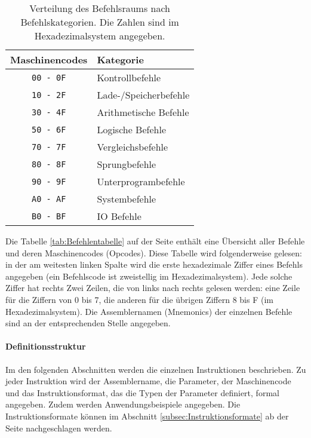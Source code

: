 \begin{table}
  \centering
  \begin{tabular}{|c|l|}                        \hline
    Maschinencodes   & Kategorie              \\\hline\hline
    \texttt{00 - 0F} & Kontrollbefehle        \\
    \texttt{10 - 2F} & Lade-/Speicherbefehle  \\
    \texttt{30 - 4F} & Arithmetische Befehle  \\
    \texttt{50 - 6F} & Logische Befehle       \\
    \texttt{70 - 7F} & Vergleichsbefehle      \\
    \texttt{80 - 8F} & Sprungbefehle          \\
    \texttt{90 - 9F} & Unterprogrambefehle    \\
    \texttt{A0 - AF} & Systembefehle          \\
    \texttt{B0 - BF} & IO Befehle             \\\hline
  \end{tabular}
  \caption[Verteilung des Befehlsraums]
          {Verteilung des Befehlsraums nach Befehlskategorien.
          Die Zahlen sind im Hexadezimalsystem angegeben.}
  \label{tab:Befehlraumverteilung}
\end{table}


Die Tabelle \ref{tab:Befehlentabelle} auf der Seite 
\pageref{tab:Befehlentabelle} enthält eine Übersicht aller Befehle und
deren Maschinencodes (Opcodes).
Diese Tabelle wird folgenderweise gelesen:
in der am weitesten linken Spalte wird die erste hexadezimale Ziffer eines
Befehls angegeben (ein Befehlscode ist zweistellig im Hexadezimalsystem).
Jede solche Ziffer hat rechts Zwei Zeilen, die von links nach rechts gelesen
werden: eine Zeile für die Ziffern von 0 bis 7, die anderen für die übrigen
Ziffern 8 bis F (im Hexadezimalsystem). Die Assemblernamen (Mnemonics) der
einzelnen Befehle sind an der entsprechenden Stelle angegeben.

\paragraph{Definitionsstruktur}
Im den folgenden Abschnitten werden die einzelnen Instruktionen beschrieben. Zu
jeder Instruktion wird der Assemblername, die Parameter, der Maschinencode
und das Instruktionsformat, das die Typen der Parameter definiert, formal
angegeben. Zudem werden Anwendungsbeispiele angegeben. Die Instruktionsformate
können im Abschnitt \ref{subsec:Instruktionsformate} ab der Seite
\pageref{subsec:Instruktionsformate} nachgeschlagen werden.

